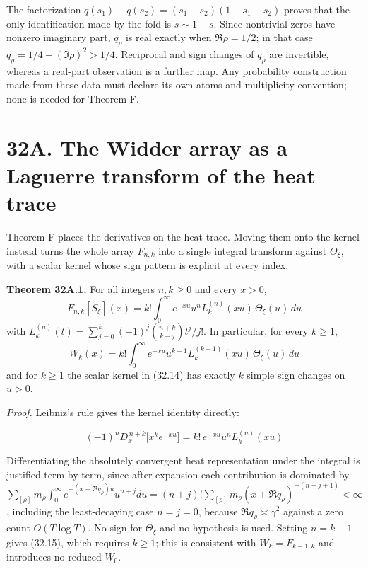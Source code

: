 \documentclass[
  11pt,
]{book}
\renewenvironment{quote}
  {\begin{tcolorbox}[
      enhanced,
      breakable,
      colback=tncream,
      colframe=tnrust,
      boxrule=0.8pt,
      arc=1.5pt,
      left=7pt,
      right=7pt,
      top=6pt,
      bottom=6pt]}
  {\end{tcolorbox}}
\begin{document}
The factorization \(q(s_1)-q(s_2)=(s_1-s_2)(1-s_1-s_2)\) proves that the
only identification made by the fold is \(s\sim1-s\). Since nontrivial
zeros have nonzero imaginary part, \(q_\rho\) is real exactly when
\(\Re\rho=1/2\); in that case \(q_\rho=1/4+(\Im\rho)^2>1/4\). Reciprocal
and sign changes of \(q_\rho\) are invertible, whereas a real-part
observation is a further map. Any probability construction made from
these data must declare its own atoms and multiplicity convention; none
is needed for Theorem F.

\section{32A. The Widder array as a Laguerre transform of the heat
trace}\label{a.-the-widder-array-as-a-laguerre-transform-of-the-heat-trace}

Theorem F places the derivatives on the heat trace. Moving them onto the
kernel instead turns the whole array \(F_{n,k}\) into a single integral
transform against \(\Theta_\xi\), with a scalar kernel whose sign
pattern is explicit at every index.

\begin{quote}
\textbf{Theorem 32A.1.} For all integers \(n,k\ge0\) and every \(x>0\),
\[
\boxed{\ F_{n,k}[S_\xi](x)=k!\int_0^\infty e^{-xu}u^{n}L_k^{(n)}(xu)\,\Theta_\xi(u)\,du\ }
\tag{32.14}
\] with \(L_k^{(n)}(t)=\sum_{j=0}^k(-1)^j\binom{n+k}{k-j}t^j/j!\). In
particular, for every \(k\ge1\), \[
\boxed{\ W_k(x)=k!\int_0^\infty e^{-xu}u^{k-1}L_k^{(k-1)}(xu)\,\Theta_\xi(u)\,du\ }
\tag{32.15}
\] and for \(k\ge1\) the scalar kernel in (32.14) has exactly \(k\)
simple sign changes on \(u>0\).
\end{quote}

\emph{Proof.} Leibniz's rule gives the kernel identity directly:

\[
(-1)^nD_x^{\,n+k}\bigl[x^ke^{-xu}\bigr]=k!\,e^{-xu}u^nL_k^{(n)}(xu)
\tag{32.16}
\]

Differentiating the absolutely convergent heat representation under the
integral is justified term by term, since after expansion each
contribution is dominated by
\(\sum_{[\rho]}m_\rho\int_0^\infty e^{-(x+\Re q_\rho)u}u^{n+j}du
=(n+j)!\sum_{[\rho]}m_\rho(x+\Re q_\rho)^{-(n+j+1)}<\infty\), including
the least-decaying case \(n=j=0\), because \(\Re q_\rho\asymp\gamma^2\)
against a zero count \(O(T\log T)\). No sign for \(\Theta_\xi\) and no
hypothesis is used. Setting \(n=k-1\) gives (32.15), which requires
\(k\ge1\); this is consistent with \(W_k=F_{k-1,k}\) and introduces no
reduced \(W_0\).
\end{document}
